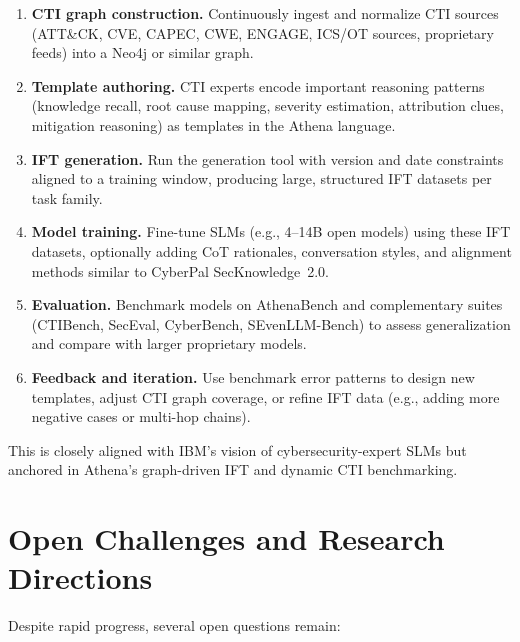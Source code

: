 \documentclass[sigconf]{acmart}
\begin{document}
\begin{enumerate}
  \item \textbf{CTI graph construction.} Continuously ingest and normalize CTI sources (ATT\&CK, CVE, CAPEC, CWE, ENGAGE, ICS/OT sources, proprietary feeds) into a Neo4j or similar graph.
  \item \textbf{Template authoring.} CTI experts encode important reasoning patterns (knowledge recall, root cause mapping, severity estimation, attribution clues, mitigation reasoning) as templates in the Athena language.
  \item \textbf{IFT generation.} Run the generation tool with version and date constraints aligned to a training window, producing large, structured IFT datasets per task family.\cite{cardei2025ift}
  \item \textbf{Model training.} Fine-tune SLMs (e.g., 4--14B open models) using these IFT datasets, optionally adding CoT rationales, conversation styles, and alignment methods similar to CyberPal SecKnowledge~2.0.\cite{levi2025toward}
  \item \textbf{Evaluation.} Benchmark models on AthenaBench and complementary suites (CTIBench, SecEval, CyberBench, SEvenLLM-Bench) to assess generalization and compare with larger proprietary models.\cite{alam2024ctibench,alam2025athenabench,hu2024seceval,liu2024cyberbench,ji2024sevenllm}
  \item \textbf{Feedback and iteration.} Use benchmark error patterns to design new templates, adjust CTI graph coverage, or refine IFT data (e.g., adding more negative cases or multi-hop chains).
\end{enumerate}

This is closely aligned with IBM's vision of cybersecurity-expert SLMs but anchored in Athena's graph-driven IFT and dynamic CTI benchmarking.

\section{Open Challenges and Research Directions}

Despite rapid progress, several open questions remain:
\end{document}
